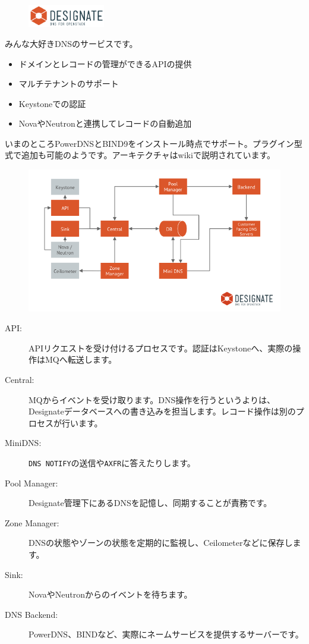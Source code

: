 \begin{figure}
	\begin{center}
		\includegraphics[width=0.3\textwidth]{img/logo-designate.pdf}
	\end{center}
\end{figure}

みんな大好きDNSのサービスです。

\begin{itemize}
	\item ドメインとレコードの管理ができるAPIの提供
	\item マルチテナントのサポート
	\item Keystoneでの認証
	\item NovaやNeutronと連携してレコードの自動追加
\end{itemize}

いまのところPowerDNSとBIND9をインストール時点でサポート。プラグイン型式で追加も可能のようです。アーキテクチャはwikiで説明されています。

\begin{figure}
	\begin{center}
		\includegraphics[width=\textwidth]{img/Designate-Arch.png}
	\end{center}
\end{figure}

\begin{description}
	\item[API:] APIリクエストを受け付けるプロセスです。認証はKeystoneへ、実際の操作はMQへ転送します。
	\item[Central:] MQからイベントを受け取ります。DNS操作を行うというよりは、Designateデータベースへの書き込みを担当します。レコード操作は別のプロセスが行います。
	\item[MiniDNS:] \verb|DNS NOTIFY|の送信や\verb|AXFR|に答えたりします。
	\item[Pool Manager:] Designate管理下にあるDNSを記憶し、同期することが責務です。
	\item[Zone Manager:] DNSの状態やゾーンの状態を定期的に監視し、Ceilometerなどに保存します。
	\item[Sink:] NovaやNeutronからのイベントを待ちます。
	\item[DNS Backend:] PowerDNS、BINDなど、実際にネームサービスを提供するサーバーです。
\end{description}

